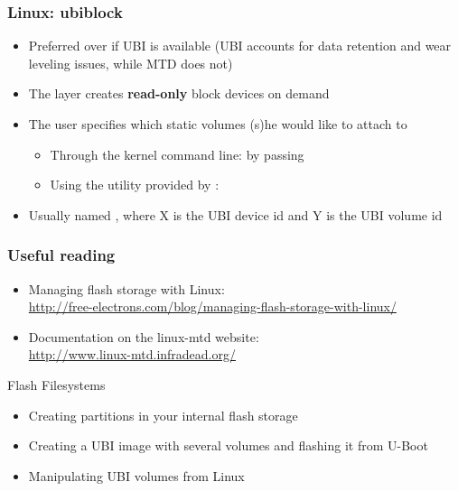 \begin{frame}
  \frametitle{Linux: ubiblock}
  \begin{itemize}
  \item Preferred over  if UBI is available (UBI accounts
    for data retention and wear leveling issues, while MTD does not)
  \item The  layer creates {\bf read-only} block devices
    on demand
  \item The user specifies which static volumes (s)he would like to attach
    to 
    \begin{itemize}
    \item Through the kernel command line: by passing
    \item Using the  utility provided by :
    \end{itemize}

   \item Usually named , where X is the UBI device
     id and Y is the UBI volume id
  \end{itemize}
\end{frame}

\begin{frame}
  \frametitle{Useful reading}
  \begin{itemize}
  \item Managing flash storage with Linux:\\
    \url{http://free-electrons.com/blog/managing-flash-storage-with-linux/}
  \item Documentation on the linux-mtd website:\\
    \url{http://www.linux-mtd.infradead.org/}
  \end{itemize}
\end{frame}

\setuplabframe
{Flash Filesystems}
{
  \begin{itemize}
  \item Creating partitions in your internal flash storage
  \item Creating a UBI image with several volumes and flashing it from
    U-Boot
  \item Manipulating UBI volumes from Linux
  \end{itemize}
}
